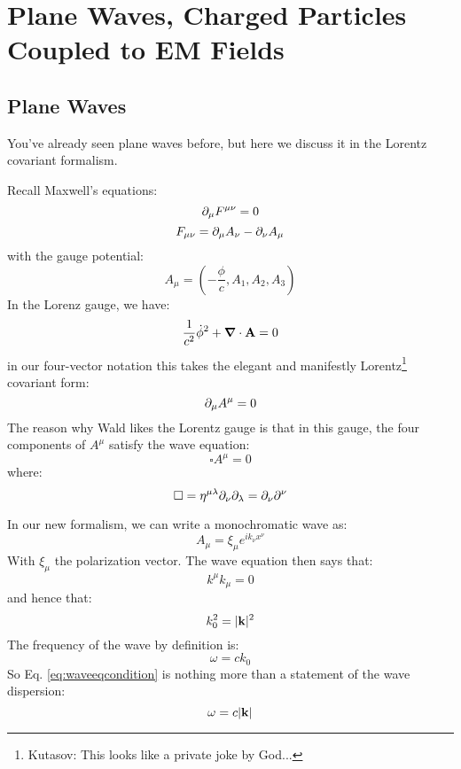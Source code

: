 \section{Plane Waves, Charged Particles Coupled to EM Fields}

\subsection{Plane Waves}
You've already seen plane waves before, but here we discuss it in the Lorentz covariant formalism.

Recall Maxwell's equations:
\begin{equation}
    \partial_\mu F^{\mu\nu} = 0
\end{equation}
\begin{equation}
    F_{\mu\nu} = \partial_\mu A_\nu - \partial_\nu A_\mu
\end{equation}
with the gauge potential:
\begin{equation}
    A_\mu = \left(-\frac{\phi}{c}, A_1, A_2, A_3\right)
\end{equation}
In the Lorenz gauge, we have:
\begin{equation}
    \frac{1}{c^2}\dot{\phi}^2 + \nabla \cdot \v{A} = 0
\end{equation}
in our four-vector notation this takes the elegant and manifestly Lorentz\footnote{Kutasov: This looks like a private joke by God...} covariant form:
\begin{equation}
    \partial_\mu A^\mu = 0
\end{equation}
The reason why Wald likes the Lorentz gauge is that in this gauge, the four components of $A^\mu$ satisfy the wave equation:
\begin{equation}
    \square A^\mu = 0
\end{equation}
where:
\begin{equation}
    \square = \eta^{\mu\lambda}\partial_\nu \partial_\lambda = \partial_\nu\partial^\nu 
\end{equation}

In our new formalism, we can write a monochromatic wave as:
\begin{equation}
    A_\mu = \xi_\mu e^{ik_\nu x^\nu}
\end{equation}
With $\xi_\mu$ the polarization vector. The wave equation then says that:
\begin{equation}
    k^\mu k_\mu = 0
\end{equation}
and hence that:
\begin{equation}\label{eq:waveeqcondition}
    k_0^2 = \lvert \mathbf{k} \rvert^2
\end{equation}
The frequency of the wave by definition is:
\begin{equation}
    \omega = ck_0
\end{equation}
So Eq. \eqref{eq:waveeqcondition} is nothing more than a statement of the wave dispersion:
\begin{equation}
    \omega = c\lvert \mathbf{k} \rvert
\end{equation}

